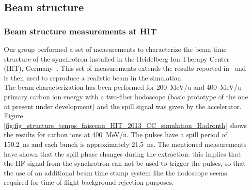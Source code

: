 
\subsection{Beam structure}
\label{subsection:modelisation_fasceau_ions_CC_hadrontherapy_Geant4}
\subsubsection{Beam structure measurements at HIT}\label{beam_measurement}
Our group performed a set of measurements to characterize the beam time structure of the synchrotron installed in the Heidelberg Ion Therapy Center (HIT), Germany~\cite{HIT_timestructure}. This set of measurements extends the results reported in~\cite{HIT_timestructure} and is then used to reproduce a realistic beam in the simulation.\\
The beam characterization has been performed for 200~MeV/u and 400~MeV/u primary carbon ion energy with a two-fiber hodoscope (basic prototype of the one at present under development) and the spill signal was given by the accelerator. Figure \ref{fig:fig_structure_temps_faisceau_HIT_2013_CC_simulation_Hadronth} shows the results for carbon ions at 400~MeV/u. The pulses have a spill period of 150.2~ns and each bunch is approximately 21.5~ns.
The mentioned measurements have shown that the spill phase changes during the extraction: this implies that the HF signal from the synchrotron can not be used to trigger the pulses, so that the use of an additional beam time stamp system like the hodoscope seems required for time-of-flight background rejection purposes.

